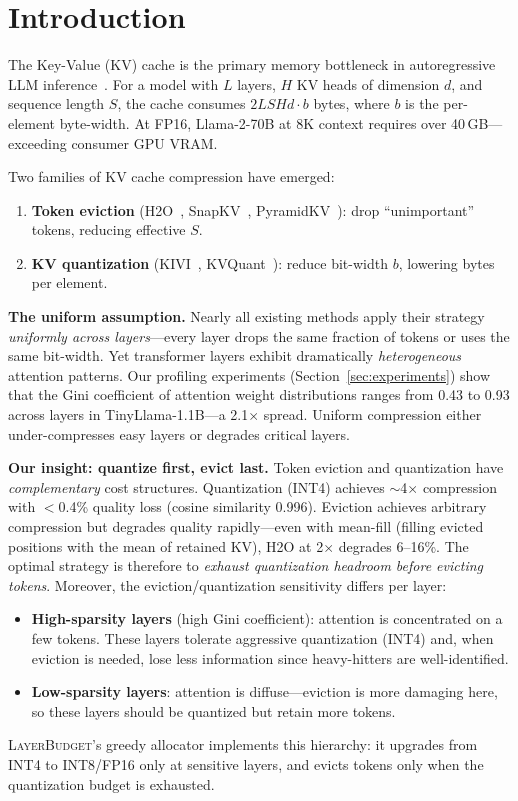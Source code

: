 \documentclass{article}
\newcommand{\layerbudget}{\textsc{LayerBudget}\xspace}
\newcommand{\nlayers}{L}
\newcommand{\nheads}{H}
\newcommand{\hdim}{d}
\begin{document}
\section{Introduction}
\label{sec:intro}

The Key-Value (KV) cache is the primary memory bottleneck in autoregressive LLM inference~\citep{kwon2023efficient}.
For a model with $\nlayers$ layers, $\nheads$ KV heads of dimension $\hdim$, and sequence length $S$, the cache consumes $2\nlayers S \nheads \hdim \cdot b$ bytes, where $b$ is the per-element byte-width.
At FP16, Llama-2-70B at 8K context requires over 40\,GB---exceeding consumer GPU VRAM.

Two families of KV cache compression have emerged:
\begin{enumerate}
    \item \textbf{Token eviction} (H2O~\citep{zhang2024h2o}, SnapKV~\citep{snapkv2024}, PyramidKV~\citep{pyramidkv2024}): drop ``unimportant'' tokens, reducing effective $S$.
    \item \textbf{KV quantization} (KIVI~\citep{liu2024kivi}, KVQuant~\citep{hooper2024kvquant}): reduce bit-width $b$, lowering bytes per element.
\end{enumerate}

\textbf{The uniform assumption.}
Nearly all existing methods apply their strategy \emph{uniformly across layers}---every layer drops the same fraction of tokens or uses the same bit-width.
Yet transformer layers exhibit dramatically \emph{heterogeneous} attention patterns.
Our profiling experiments (Section~\ref{sec:experiments}) show that the Gini coefficient of attention weight distributions ranges from 0.43 to 0.93 across layers in TinyLlama-1.1B---a 2.1$\times$ spread.
Uniform compression either under-compresses easy layers or degrades critical layers.

\textbf{Our insight: quantize first, evict last.}
Token eviction and quantization have \emph{complementary} cost structures.
Quantization (INT4) achieves $\sim$4$\times$ compression with $<$0.4\% quality loss (cosine similarity 0.996).
Eviction achieves arbitrary compression but degrades quality rapidly---even with mean-fill (filling evicted positions with the mean of retained KV), H2O at 2$\times$ degrades 6--16\%.
The optimal strategy is therefore to \emph{exhaust quantization headroom before evicting tokens}.
Moreover, the eviction/quantization sensitivity differs per layer:
\begin{itemize}
    \item \textbf{High-sparsity layers} (high Gini coefficient): attention is concentrated on a few tokens.  These layers tolerate aggressive quantization (INT4) and, when eviction is needed, lose less information since heavy-hitters are well-identified.
    \item \textbf{Low-sparsity layers}: attention is diffuse---eviction is more damaging here, so these layers should be quantized but retain more tokens.
\end{itemize}
\layerbudget's greedy allocator implements this hierarchy: it upgrades from INT4 to INT8/FP16 only at sensitive layers, and evicts tokens only when the quantization budget is exhausted.
\end{document}
